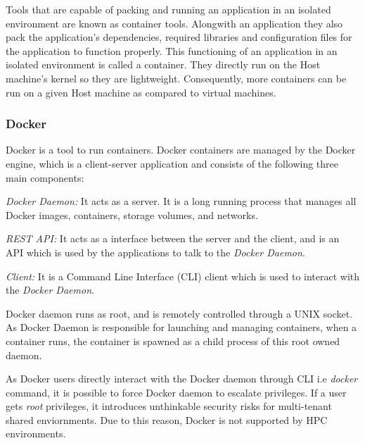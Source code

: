 \documentclass[a4paper,num-refs]{oup-contemporary}
\begin{document}
Tools that are capable of packing and running an application in an isolated environment
are known as container tools. Alongwith an application they also pack the application's dependencies,
required libraries and configuration files for the
application to function properly. This functioning of an application in an isolated environment
is called a container. They directly run on the Host machine's kernel so they are lightweight.
Consequently, more containers can be run on a given Host machine as compared to virtual machines.

\subsubsection{Docker}

Docker is a tool to run containers.
Docker containers are managed by the Docker engine, which is a client-server application and
consists of the following three main components: 

\textit{Docker Daemon:} It acts as a server. It is
a long running process that manages all Docker images, containers, storage volumes, and networks.

\textit{REST API:} It acts as a interface between the server and the client, and is an API which is used by the applications
to talk to the \textit{Docker Daemon}.

\textit{Client:} It is a Command Line Interface (CLI) client which is used to interact with the \textit{Docker Daemon}.

Docker daemon runs as root, and is remotely controlled through a
UNIX socket. As Docker Daemon is responsible for launching and managing containers,
when a container runs, the container is spawned as a
child process of this root owned daemon.

As Docker users directly interact with the
Docker daemon through CLI i.e \textit{docker} command, it is possible to force Docker daemon to escalate privileges.
If a user gets \textit{root} privileges, it introduces unthinkable security risks
for multi-tenant shared enviornments. Due to this reason, Docker is not
supported by HPC environments.
\end{document}
